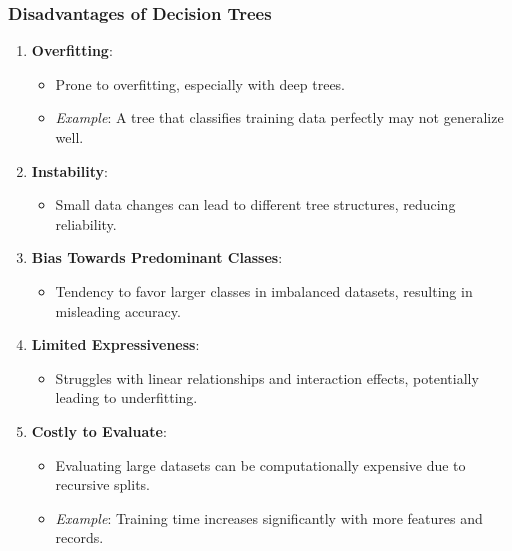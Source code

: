 \documentclass[aspectratio=169]{beamer}
\begin{document}
\begin{frame}[fragile]
    \frametitle{Disadvantages of Decision Trees}
    \begin{enumerate}
        \item \textbf{Overfitting}:
        \begin{itemize}
            \item Prone to overfitting, especially with deep trees.
            \item \textit{Example}: A tree that classifies training data perfectly may not generalize well.
        \end{itemize}

        \item \textbf{Instability}:
        \begin{itemize}
            \item Small data changes can lead to different tree structures, reducing reliability.
        \end{itemize}
        
        \item \textbf{Bias Towards Predominant Classes}:
        \begin{itemize}
            \item Tendency to favor larger classes in imbalanced datasets, resulting in misleading accuracy.
        \end{itemize}
        
        \item \textbf{Limited Expressiveness}:
        \begin{itemize}
            \item Struggles with linear relationships and interaction effects, potentially leading to underfitting.
        \end{itemize}
        
        \item \textbf{Costly to Evaluate}:
        \begin{itemize}
            \item Evaluating large datasets can be computationally expensive due to recursive splits.
            \item \textit{Example}: Training time increases significantly with more features and records.
        \end{itemize}
    \end{enumerate}
\end{frame}
\end{document}
